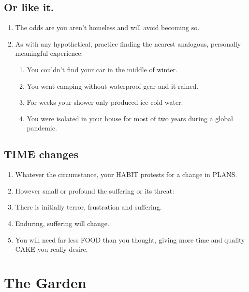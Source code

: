 \documentclass[
]{book}
\providecommand{\tightlist}{%
  \setlength{\itemsep}{0pt}\setlength{\parskip}{0pt}}
\begin{document}
\hypertarget{or-like-it.}{%
\subsection{Or like it.}\label{or-like-it.}}

\begin{enumerate}
\def\labelenumi{\arabic{enumi}.}
\setcounter{enumi}{28}
\tightlist
\item
  The odds are you aren't homeless and will avoid becoming so.
\item
  As with any hypothetical, practice finding the nearest analogous, personally meaningful experience:

  \begin{enumerate}
  \def\labelenumii{\arabic{enumii}.}
  \tightlist
  \item
    You couldn't find your car in the middle of winter.
  \item
    You went camping without waterproof gear and it rained.
  \item
    For weeks your shower only produced ice cold water.
  \item
    You were isolated in your house for most of two years during a global pandemic.
  \end{enumerate}
\end{enumerate}

\hypertarget{time-changes}{%
\subsection{TIME changes}\label{time-changes}}

\begin{enumerate}
\def\labelenumi{\arabic{enumi}.}
\setcounter{enumi}{30}
\tightlist
\item
  Whatever the circumstance, your HABIT protests for a change in PLANS.
\item
  However small or profound the suffering or its threat:
\item
  There is initially terror, frustration and suffering.
\item
  Enduring, suffering will change.
\item
  You will need far less FOOD than you thought, giving more time and quality CAKE you really desire.
\end{enumerate}

\hypertarget{the-garden}{%
\section{The Garden}\label{the-garden}}
\end{document}
